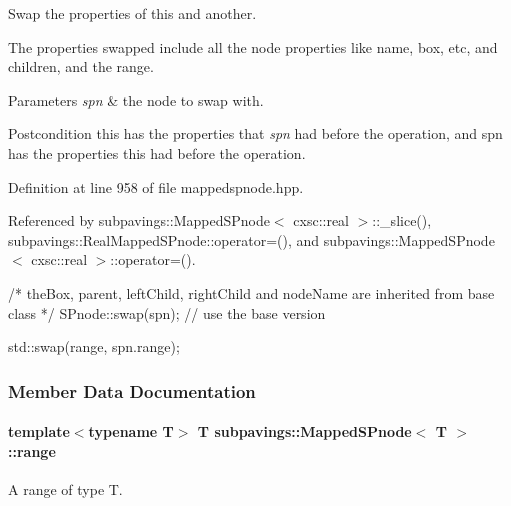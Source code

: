 \-Swap the properties of this and another. 

\-The properties swapped include all the node properties like name, box, etc, and children, and the range.


\begin{DoxyParams}{\-Parameters}
{\em spn} & the node to swap with. \\
\hline
\end{DoxyParams}
\begin{DoxyPostcond}{\-Postcondition}
this has the properties that {\itshape spn\/} had before the operation, and spn has the properties this had before the operation. 
\end{DoxyPostcond}


\-Definition at line 958 of file mappedspnode.\-hpp.



\-Referenced by subpavings\-::\-Mapped\-S\-Pnode$<$ cxsc\-::real $>$\-::\-\_\-slice(), subpavings\-::\-Real\-Mapped\-S\-Pnode\-::operator=(), and subpavings\-::\-Mapped\-S\-Pnode$<$ cxsc\-::real $>$\-::operator=().


\begin{DoxyCode}
  {
    /* theBox, parent, leftChild,
    rightChild and nodeName are inherited from base class */
    SPnode::swap(spn); // use the base version
    
    std::swap(range, spn.range);
  }
\end{DoxyCode}


\subsubsection{\-Member \-Data \-Documentation}
\hypertarget{classsubpavings_1_1MappedSPnode_a85f4e42ee09fcfa8c47835231ac3c21d}{
\paragraph[{range}]{\setlength{\rightskip}{0pt plus 5cm}template$<$typename \-T$>$ \-T {\bf subpavings\-::\-Mapped\-S\-Pnode}$<$ \-T $>$\-::{\bf range}}}\label{classsubpavings_1_1MappedSPnode_a85f4e42ee09fcfa8c47835231ac3c21d}


\-A range of type \-T. 



